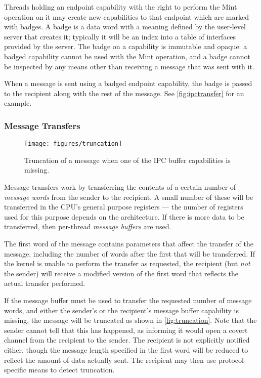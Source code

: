 Threads holding an endpoint capability with the right to perform the
Mint operation on it may create new capabilities to that endpoint which
are marked with badges. A badge is a data word with a meaning defined by
the user-level server that creates it; typically it will be an index into a
table of interfaces provided by the server. The badge on a capability is
immutable and opaque: a badged capability cannot be used with the Mint operation, and a badge cannot be inspected by any means other than receiving a message that was sent with it.

When a message is sent using a badged endpoint capability, the badge is passed
to the recipient along with the rest of the message. See
\autoref{fig:ipctransfer} for an example.

\subsubsection{Message Transfers}

\begin{figure}
\centering \texttt{[image: figures/truncation]}
\caption{Truncation of a message when one of the IPC buffer capabilities is
missing.}
\label{fig:truncation}
\end{figure}

Message transfers work by transferring the contents of a certain number of
\emph{message words} from the sender to the recipient. A small number of
these will be transferred in the CPU's general purpose registers --- the number
of registers used for this purpose depends on the architecture. If there is
more data to be transferred, then per-thread \emph{message buffers} are used.

The first word of the message contains parameters that affect the transfer of
the message, including the number of words after the first that will be
transferred. If the kernel is unable to perform the transfer as requested, the
recipient (but \emph{not} the sender) will receive a modified version of the
first word that reflects the actual transfer performed.

If the message buffer must be used to transfer the requested number of message
words, and either the
sender's or the recipient's message buffer capability is missing, the message
will be truncated as shown in \autoref{fig:truncation}. Note that the
sender cannot tell that this has happened, as informing it would open a covert
channel from the recipient to the sender. The recipient is not explicitly
notified either, though the message length specified in the first word will be
reduced to reflect the amount of data actually sent. The recipient may then use
protocol-specific means to detect truncation.

